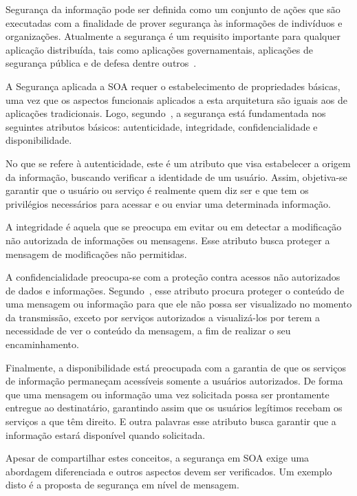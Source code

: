 Segurança da informação pode ser definida como um conjunto de ações que são executadas com a finalidade de prover segurança às informações de indivíduos e organizações. Atualmente a segurança é um requisito importante para qualquer aplicação distribuída, tais como aplicações governamentais, aplicações de segurança pública e de defesa dentre outros~\cite{Bertino2010}.

A Segurança aplicada a SOA requer o estabelecimento de propriedades básicas, uma vez que os aspectos funcionais aplicados a esta arquitetura são iguais aos de aplicações tradicionais.  Logo, segundo~\cite{Verissimo2001}, a segurança está fundamentada nos seguintes atributos básicos: autenticidade, integridade, confidencialidade e disponibilidade.

No que se refere à autenticidade, este é um atributo que visa estabelecer a origem da informação, buscando verificar a identidade de um usuário. Assim, objetiva-se garantir que o usuário ou serviço é realmente quem diz ser e que tem os privilégios necessários para acessar e ou enviar uma determinada informação.

A integridade é aquela que se preocupa em evitar ou em detectar a modificação não autorizada de informações ou mensagens. Esse atributo busca proteger a mensagem de modificações não permitidas.

A confidencialidade preocupa-se com a proteção contra acessos não autorizados de dados e informações. Segundo~\cite{Bertino2010}, esse atributo procura proteger o conteúdo de uma mensagem ou informação  para que ele não possa ser visualizado no momento da transmissão, exceto por serviços autorizados a visualizá-los por terem a necessidade de ver o conteúdo da mensagem, a fim de realizar o seu encaminhamento.

Finalmente, a disponibilidade está preocupada com a garantia de que os serviços de informação permaneçam acessíveis somente a usuários autorizados. De forma que uma mensagem ou informação uma vez solicitada possa ser prontamente entregue ao destinatário, garantindo assim que os usuários legítimos recebam os serviços a que têm direito. E outra palavras esse atributo busca garantir que a informação estará disponível quando solicitada.

Apesar de compartilhar estes conceitos,  a segurança em SOA exige uma abordagem  diferenciada e outros aspectos devem ser verificados. Um exemplo disto é a proposta de segurança em nível de mensagem.

